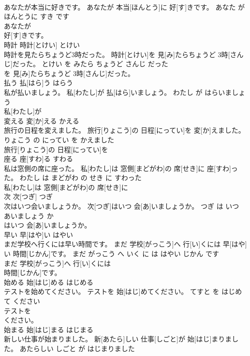 \documentclass[8pt]{extreport}
\begin{document}
\begin{CJK}{UTF8}{min}
\\	あなたが本当に好きです。	あなたが 本当[ほんとう]に 好[す]きです。	あなた が ほんとうに すき です	
\\	あなたが
\\	好[す]きです。			
\\	時計	時計[とけい]	とけい	
\\	時計を見たらちょうど3時だった。	時計[とけい]を 見[み]たらちょうど 3時[さんじ]だった。	とけい を みたら ちょうど さんじ だった	
\\	を 見[み]たらちょうど 3時[さんじ]だった。			
\\	払う	払[はら]う	はらう	
\\	私が払いましょう。	私[わたし]が 払[はら]いましょう。	わたし が はらいましょう	
\\	私[わたし]が
\\	変える	変[か]える	かえる	
\\	旅行の日程を変えました。	旅行[りょこう]の 日程[にってい]を 変[か]えました。	りょこう の にってい を かえました	
\\	旅行[りょこう]の 日程[にってい]を
\\	座る	座[すわ]る	すわる	
\\	私は窓側の席に座った。	私[わたし]は 窓側[まどがわ]の 席[せき]に 座[すわ]った。	わたし は まどがわ の せき に すわった	
\\	私[わたし]は 窓側[まどがわ]の 席[せき]に
\\	次	次[つぎ]	つぎ	
\\	次はいつ会いましょうか。	次[つぎ]はいつ 会[あ]いましょうか。	つぎ は いつ あいましょう か	
\\	はいつ 会[あ]いましょうか。			
\\	早い	早[はや]い	はやい	
\\	まだ学校へ行くには早い時間です。	まだ 学校[がっこう]へ 行[い]くには 早[はや]い 時間[じかん]です。	まだ がっこう へ いく に は はやい じかん です	
\\	まだ 学校[がっこう]へ 行[い]くには
\\	時間[じかん]です。			
\\	始める	始[はじ]める	はじめる	
\\	テストを始めてください。	テストを 始[はじ]めてください。	てすと を はじめて ください	
\\	テストを
\\	ください。			
\\	始まる	始[はじ]まる	はじまる	
\\	新しい仕事が始まりました。	新[あたら]しい 仕事[しごと]が 始[はじ]まりました。	あたらしい しごと が はじまりました	

\end{CJK}
\end{document}
